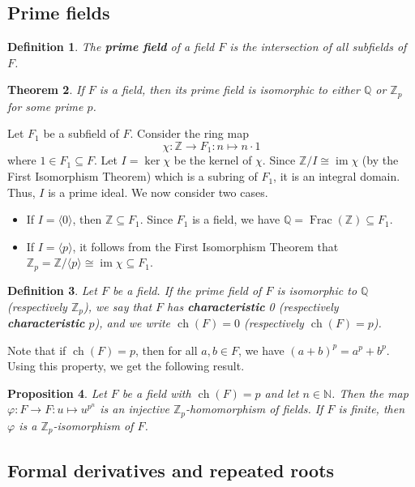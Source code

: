 \documentclass[10pt]{article}
\makeatletter
\newcommand{\N}{\mathbb{N}}
\newcommand{\Z}{\mathbb{Z}}
\newcommand{\Q}{\mathbb{Q}}
\DeclareMathOperator{\Frac}{Frac}
\DeclareMathOperator{\im}{im}
\DeclareMathOperator{\ch}{ch}
\theoremstyle{newstyle}
\newtheorem{thm}{Theorem}[section]
\newtheorem{prop}[thm]{Proposition}
\newtheorem{defn}[thm]{Definition}
\newenvironment{pf}[1][\proofname]{\par
  \pushQED{\qed}%
  \normalfont \topsep0\p@\relax
  \trivlist
  \item[\hskip\labelsep\scshape
  #1\@addpunct{.}]\ignorespaces
}{%
  \popQED\endtrivlist\@endpefalse
}
\makeatother
\begin{document}
\subsection{Prime fields}

\begin{defn}
The {\bf prime field} of a field $F$ is the intersection of all subfields of $F$.
\end{defn}

\begin{thm}
If $F$ is a field, then its prime field is isomorphic to either $\Q$ or $\Z_p$ for 
some prime $p$.
\end{thm}
\begin{pf}
Let $F_1$ be a subfield of $F$. Consider the ring map 
\[ \chi : \Z \to F_1 : n \mapsto n \cdot 1 \]
where $1 \in F_1 \subseteq F$. Let $I = \ker\chi$ be the kernel of $\chi$. 
Since $\Z/I \cong \im\chi$ (by the First Isomorphism Theorem) which is a subring of 
$F_1$, it is an integral domain. Thus, $I$ is a prime ideal. We now consider two cases. 
\begin{itemize}
    \item If $I = \langle 0 \rangle$, then $\Z \subseteq F_1$. Since $F_1$ is a field, 
    we have 
    $\Q = \Frac(\Z) \subseteq F_1$. 
    \item If $I = \langle p \rangle$, it follows from the First Isomorphism Theorem that 
    $\Z_p = \Z/\langle p \rangle \cong \im\chi \subseteq F_1$. \qedhere 
\end{itemize}
\end{pf}

\begin{defn}
Let $F$ be a field. If the prime field of $F$ is isomorphic to $\Q$ (respectively $\Z_p$), 
we say that $F$ has {\bf characteristic} 0 (respectively {\bf characteristic} $p$), 
and we write $\ch(F) = 0$ (respectively $\ch(F) = p$).
\end{defn}

Note that if $\ch(F) = p$, then for all $a, b \in F$, we have $(a+b)^p = a^p + b^p$. 
Using this property, we get the following result. 

\begin{prop}
Let $F$ be a field with $\ch(F) = p$ and let $n \in \N$. Then the map $\varphi : F \to F 
: u \mapsto u^{p^n}$ is an injective $\Z_p$-homomorphism of fields. If $F$ is finite, then 
$\varphi$ is a $\Z_p$-isomorphism of $F$.
\end{prop}

\subsection{Formal derivatives and repeated roots}
\end{document}
